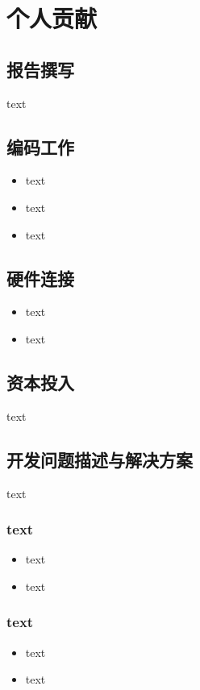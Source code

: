 
\section{个人贡献}


\subsection{报告撰写}text


\subsection{编码工作}\begin{itemize}
    \item text
    \item text
    \item text
\end{itemize}
\subsection{硬件连接}\begin{itemize}
    \item text
    \item text
\end{itemize}
\subsection{资本投入}text


\subsection{开发问题描述与解决方案}
text

\subsubsection{text}
\begin{itemize}
    \item text
    \item text
\end{itemize}



\subsubsection{text}
\begin{itemize}
    \item text
    \item text
\end{itemize}



